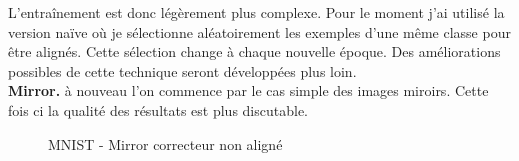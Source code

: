 L'entraînement est donc légèrement plus complexe. Pour le moment j'ai utilisé 
la version naïve où je sélectionne aléatoirement les exemples d'une même classe
pour être alignés. Cette sélection change à chaque nouvelle époque. Des 
améliorations possibles de cette technique seront développées plus loin.\\


{\Large\textbf{Mirror.}} à nouveau l'on commence par le cas simple des images 
miroirs. Cette fois ci la qualité des résultats est plus discutable. 

\begin{figure}[H] %
\centering
{}
\hfill
{}
\caption{MNIST - Mirror correcteur non aligné}
\label{fig:mnist_mirror_classwise}
\end{figure}


